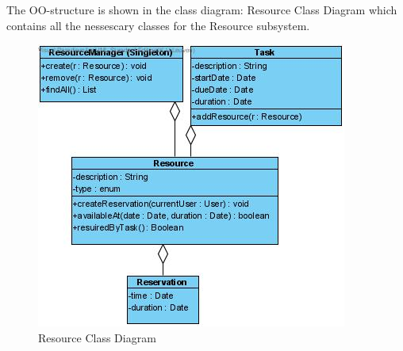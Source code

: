 \documentclass[a4paper,11pt]{article}
\begin{document}
			The OO-structure is shown in the class diagram: Resource Class Diagram which contains all the nessescary classes for the Resource subsystem.
			
			\begin{figure}[h!]
				\begin{center}
					\includegraphics[scale=0.5]{images/resource_class_diagram.jpg}
				\end{center}
				\caption{Resource Class Diagram}
			\end{figure}
\end{document}
